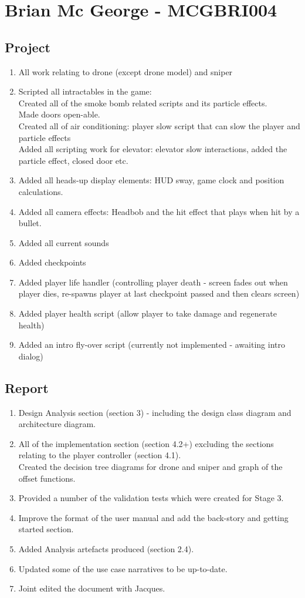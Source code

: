 \documentclass[11pt,a4paper]{article}
\begin{document}
\section{Brian Mc George - MCGBRI004}
\subsection{Project}
\begin{enumerate}
    \item All work relating to drone (except drone model) and sniper
    \item Scripted all intractables in the game:\\
    Created all of the smoke bomb related scripts and its particle effects.\\
    Made doors open-able.\\
    Created all of air conditioning: player slow script that can slow the player and particle effects\\
    Added all scripting work for elevator: elevator slow interactions, added the particle effect, closed door etc.
    \item Added all heads-up display elements: HUD sway, game clock and position calculations.
    \item Added all camera effects: Headbob and the hit effect that plays when hit by a bullet.
    \item Added all current sounds
    \item Added checkpoints
    \item Added player life handler (controlling player death - screen fades out when player dies, re-spawns player at last checkpoint passed and then clears screen)
    \item Added player health script (allow player to take damage and regenerate health)
    \item Added an intro fly-over script (currently not implemented - awaiting intro dialog)  
\end{enumerate}
\subsection{Report}
\begin{enumerate}
    \item Design Analysis section (section 3) - including the design class diagram and architecture diagram.
    \item All of the implementation section (section 4.2+) excluding the sections relating to the player controller (section 4.1).\\
          Created the decision tree diagrams for drone and sniper and graph of the offset functions.
    \item Provided a number of the validation tests which were created for Stage 3.
    \item Improve the format of the user manual and add the back-story and getting started section.
    \item Added Analysis artefacts produced (section 2.4).
    \item Updated some of the use case narratives to be up-to-date.
    \item Joint edited the document with Jacques.
\end{enumerate}
\end{document}
